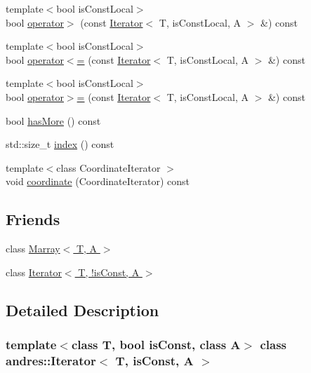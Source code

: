 \begin{DoxyCompactItemize}
\item 
{\footnotesize template$<$bool is\+Const\+Local$>$ }\\bool \hyperlink{classandres_1_1Iterator_a2db26a241958f29fd51ecfb5fa405cd3}{operator$>$} (const \hyperlink{classandres_1_1Iterator}{Iterator}$<$ T, is\+Const\+Local, A $>$ \&) const
\item 
{\footnotesize template$<$bool is\+Const\+Local$>$ }\\bool \hyperlink{classandres_1_1Iterator_ad19c0fdcff997fb2411fe20530fa241f}{operator$<$=} (const \hyperlink{classandres_1_1Iterator}{Iterator}$<$ T, is\+Const\+Local, A $>$ \&) const
\item 
{\footnotesize template$<$bool is\+Const\+Local$>$ }\\bool \hyperlink{classandres_1_1Iterator_a11fa8f85608f6f9fc7170c299755e917}{operator$>$=} (const \hyperlink{classandres_1_1Iterator}{Iterator}$<$ T, is\+Const\+Local, A $>$ \&) const
\item 
bool \hyperlink{classandres_1_1Iterator_a26f75a0ecde5e9b0512f07234ca2f39e}{has\+More} () const
\item 
std\+::size\+\_\+t \hyperlink{classandres_1_1Iterator_abf00924fc7110262606fdd9de01ebc2d}{index} () const
\item 
{\footnotesize template$<$class Coordinate\+Iterator $>$ }\\void \hyperlink{classandres_1_1Iterator_aabb5942c0b13da2dd3450f4146635e69}{coordinate} (Coordinate\+Iterator) const
\end{DoxyCompactItemize}
\subsection*{Friends}
\begin{DoxyCompactItemize}
\item 
class \hyperlink{classandres_1_1Iterator_ad7bf464de20a2e1bbc38644d8615fba8}{Marray$<$ T, A $>$}
\item 
class \hyperlink{classandres_1_1Iterator_a3e31228776921035379cfec27253f881}{Iterator$<$ T, !is\+Const, A $>$}
\end{DoxyCompactItemize}


\subsection{Detailed Description}
\subsubsection*{template$<$class T, bool is\+Const, class A$>$\newline
class andres\+::\+Iterator$<$ T, is\+Const, A $>$}

